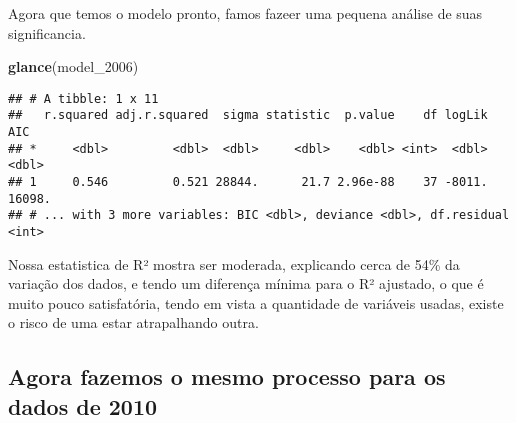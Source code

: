 \documentclass[]{article}
\newenvironment{Shaded}{\begin{snugshade}}{\end{snugshade}}
\newcommand{\KeywordTok}[1]{\textcolor[rgb]{0.13,0.29,0.53}{\textbf{#1}}}
\newcommand{\DecValTok}[1]{\textcolor[rgb]{0.00,0.00,0.81}{#1}}
\newcommand{\NormalTok}[1]{#1}
\begin{document}
Agora que temos o modelo pronto, famos fazeer uma pequena análise de
suas significancia.

\begin{Shaded}
\begin{Highlighting}[]
\KeywordTok{glance}\NormalTok{(model_}\DecValTok{2006}\NormalTok{)}
\end{Highlighting}
\end{Shaded}

\begin{verbatim}
## # A tibble: 1 x 11
##   r.squared adj.r.squared  sigma statistic  p.value    df logLik    AIC
## *     <dbl>         <dbl>  <dbl>     <dbl>    <dbl> <int>  <dbl>  <dbl>
## 1     0.546         0.521 28844.      21.7 2.96e-88    37 -8011. 16098.
## # ... with 3 more variables: BIC <dbl>, deviance <dbl>, df.residual <int>
\end{verbatim}

Nossa estatistica de R² mostra ser moderada, explicando cerca de 54\% da
variação dos dados, e tendo um diferença mínima para o R² ajustado, o
que é muito pouco satisfatória, tendo em vista a quantidade de variáveis
usadas, existe o risco de uma estar atrapalhando outra.

\subsection{Agora fazemos o mesmo processo para os dados de
2010}\label{agora-fazemos-o-mesmo-processo-para-os-dados-de-2010}
\end{document}
